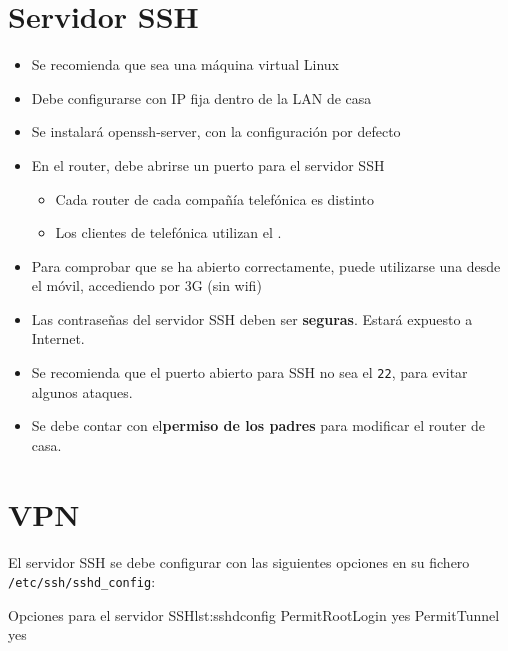 \section{Servidor SSH}
\begin{itemize}
\item Se recomienda que sea una máquina virtual Linux
\item Debe configurarse con IP fija dentro de la LAN de casa
\item Se instalará openssh-server, con la configuración por defecto
\item En el router, debe abrirse un puerto para el servidor SSH
  \begin{itemize}
  \item Cada router de cada compañía telefónica es distinto
  \item Los clientes de telefónica utilizan el .
  \end{itemize}
\item Para comprobar que se ha abierto correctamente, puede utilizarse una  desde el móvil, accediendo por 3G (sin wifi)
\end{itemize}

\begin{Aviso}
  \begin{itemize}
  \item Las contraseñas del servidor SSH deben ser \textbf{seguras}. Estará expuesto a Internet.
  \item Se recomienda que el puerto abierto para SSH no sea el \texttt{22}, para evitar algunos ataques.
  \item Se debe contar con el\textbf{permiso de los padres} para modificar el router de casa.
  \end{itemize}
\end{Aviso}


\section{VPN}
El servidor SSH se debe configurar con las siguientes opciones en su fichero \texttt{/etc/ssh/sshd\_config}:

\begin{listadoshell}{Opciones para el servidor SSH}{lst:sshdconfig}
  PermitRootLogin yes
  PermitTunnel yes
\end{listadoshell}


